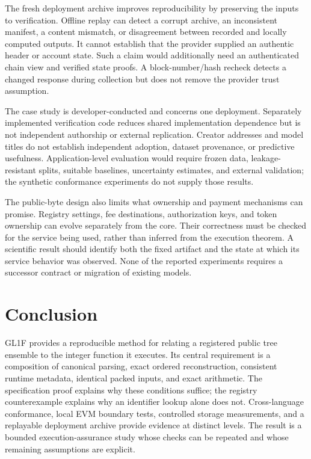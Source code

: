 \documentclass{ledger}
\begin{document}
The fresh deployment archive improves reproducibility by preserving the
inputs to verification. Offline replay can detect a corrupt archive, an
inconsistent manifest, a content mismatch, or disagreement between recorded
and locally computed outputs. It cannot establish that the provider supplied
an authentic header or account state. Such a claim would additionally need
an authenticated chain view and verified state proofs. A block-number/hash
recheck detects a changed response during collection but does not remove the
provider trust assumption.

The case study is developer-conducted and concerns one deployment. Separately
implemented verification code reduces shared implementation dependence but
is not independent authorship or external replication. Creator addresses and
model titles do not establish independent adoption, dataset provenance, or
predictive usefulness. Application-level evaluation would require frozen data,
leakage-resistant splits, suitable baselines, uncertainty estimates, and
external validation; the synthetic conformance experiments do not supply
those results.

The public-byte design also limits what ownership and payment mechanisms can
promise. Registry settings, fee destinations, authorization keys, and token
ownership can evolve separately from the core. Their correctness must be
checked for the service being used, rather than inferred from the execution
theorem. A scientific result should identify both the fixed artifact and the
state at which its service behavior was observed. None of the reported
experiments requires a successor contract or migration of existing models.

\section{Conclusion}

GL1F provides a reproducible method for relating a registered public tree
ensemble to the integer function it executes. Its central requirement is a
composition of canonical parsing, exact ordered reconstruction, consistent
runtime metadata, identical packed inputs, and exact arithmetic. The
specification proof explains why these conditions suffice; the registry
counterexample explains why an identifier lookup alone does not. Cross-language
conformance, local EVM boundary tests, controlled storage measurements, and a
replayable deployment archive provide evidence at distinct levels. The result
is a bounded execution-assurance study whose checks can be repeated and whose
remaining assumptions are explicit.
\end{document}
